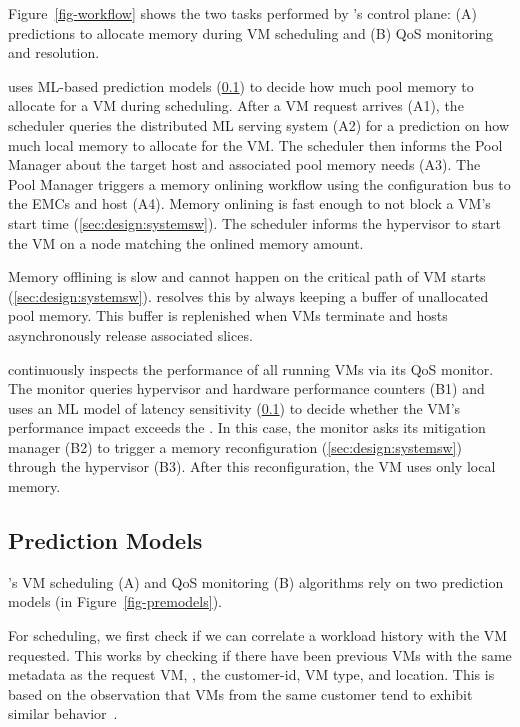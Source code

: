 {Figure~\ref{fig-workflow} shows the two tasks performed by \sys's control plane:
(A) predictions to allocate memory during VM scheduling
and (B) QoS monitoring and resolution.

\sys uses ML-based prediction models (\sec\ref{sec:design:ml})
to decide how much pool memory
to allocate for a VM during scheduling.
After a VM request arrives (A1), the scheduler queries the
distributed ML serving system (A2) for a prediction on how much local memory
to allocate for the VM. The scheduler
then informs the Pool Manager about the target host and associated pool memory
needs (A3).
The Pool Manager triggers a memory onlining workflow using the configuration
bus to the EMCs and host (A4).
Memory onlining is fast enough to not block a VM's start time (\sec\ref{sec:design:systemsw}).
The scheduler informs the hypervisor
to start the VM on a \cvn node matching the onlined memory amount.

Memory offlining is slow and cannot happen on the critical path of VM starts (\sec\ref{sec:design:systemsw}).
\sys resolves this by always keeping a buffer of unallocated pool memory.
This buffer is replenished when VMs terminate and hosts asynchronously release associated slices.





 \sys
continuously inspects the performance of all running VMs via its QoS monitor.
The monitor queries hypervisor and hardware performance counters (B1) and
uses an ML model of latency sensitivity (\sec\ref{sec:design:ml})
to decide whether the VM's performance impact exceeds the \pdm.
In this case, the monitor asks its mitigation manager (B2) to
trigger a memory reconfiguration (\sec\ref{sec:design:systemsw}) through the hypervisor (B3).
After this reconfiguration, the VM uses only local memory.

\subsection{Prediction Models}
%
\label{sec:design:ml}

\sys's VM scheduling (A) and QoS monitoring (B) algorithms rely on two
prediction models (in Figure~\ref{fig-premodels}).

 For scheduling, we first
check if we can correlate a workload history with the VM requested.
This works by checking if there have been previous VMs with the same
metadata as the request VM, \eg, the customer-id, VM type, and location.
This is based on the observation that
VMs from the same customer tend to exhibit similar
behavior~\cite{resourcecentral.sosp17}.

}
